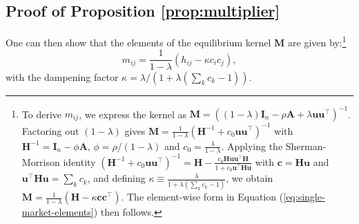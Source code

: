 \subsection{Proof of Proposition \ref{prop:multiplier}}
\label{app:proof-multiplier}
One can then show that the elements of the equilibrium kernel $\mathbf{M}$ are given by:\footnote{To derive $m_{ij}$, we express the kernel as $\mathbf{M} = ((1-\lambda)\mathbf{I}_n - \rho \mathbf{A} + \lambda \mathbf{u}\mathbf{u}^\top)^{-1}$. Factoring out $(1-\lambda)$ gives $\mathbf{M} = \frac{1}{1-\lambda} (\mathbf{H}^{-1} + c_0\mathbf{u}\mathbf{u}^\top)^{-1}$ with $\mathbf{H}^{-1} = \mathbf{I}_n - \phi \mathbf{A}$, $\phi = \rho/(1-\lambda)$ and $c_0 = \frac{\lambda}{1-\lambda}$. Applying the Sherman-Morrison identity $(\mathbf{H}^{-1} + c_0\mathbf{u}\mathbf{u}^\top)^{-1} = \mathbf{H} - \frac{c_0 \mathbf{H} \mathbf{u} \mathbf{u}^\top \mathbf{H}}{1 + c_0 \mathbf{u}^\top \mathbf{H} \mathbf{u}}$ with $\mathbf{c} = \mathbf{H}\mathbf{u}$ and $\mathbf{u}^\top \mathbf{H} \mathbf{u} = \sum_k c_k$, and defining $\kappa \equiv \frac{\lambda}{1+\lambda(\sum_k c_k-1)}$, we obtain $\mathbf{M} = \frac{1}{1-\lambda} (\mathbf{H} - \kappa \mathbf{c}\mathbf{c}^\top)$. The element-wise form in Equation (\ref{eq:single-market-elements}) then follows.}%
\begin{equation}
m_{ij} = \frac{1}{1-\lambda} \left( h_{ij} - \kappa c_i c_j \right),
\label{eq:single-market-elements}
\end{equation}
with the dampening factor
$\kappa = \lambda /(1+\lambda\left(\sum_k c_k-1\right))$. 
